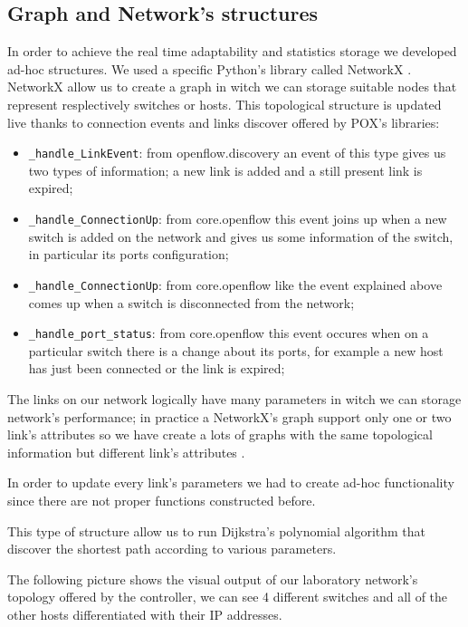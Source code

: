\documentclass[article,10pt]{IEEEtran}
\begin{document}
\subsection{Graph and Network's structures}
  In order to achieve the real time adaptability and statistics storage we developed ad-hoc structures.
  We used a specific Python's library called NetworkX \cite{networkx}. NetworkX allow us to create a graph in witch we can storage suitable nodes
  that represent resplectively switches or hosts.
  This topological structure is updated live thanks to connection events and links discover offered by POX's libraries:
  \begin{itemize}
   \item \texttt{_handle_LinkEvent}: from openflow.discovery an event of this type gives us two types of information; a new link is added and 
   a still present link is expired;
   \item \texttt{_handle_ConnectionUp}: from core.openflow this event joins up when a new switch is added on the network and gives us
   some information of the switch, in particular its ports configuration;
   \item \texttt{_handle_ConnectionUp}: from core.openflow like the event explained above comes up when a switch is disconnected from the network;
   \item \texttt{_handle_port_status}: from core.openflow this event occures when on a particular switch there is a change about its ports, for example
   a new host has just been connected or the link is expired;\\
  \end{itemize}

  
  The links on our network logically have many parameters in witch we can storage network's performance; in practice a NetworkX's graph support only 
  one or two link's attributes so we have create a lots of graphs with the same topological information but different link's attributes .
  
  In order to update every link's parameters we had to create ad-hoc functionality
  since there are not proper functions constructed before.
  
  This type of structure allow us to run Dijkstra's polynomial algorithm that discover the shortest path according to various parameters.
  
  The following picture shows the visual output of our laboratory network's topology offered by the controller, we can see 4 different switches and all of the other hosts
  differentiated with their IP addresses.
  
\end{document}

